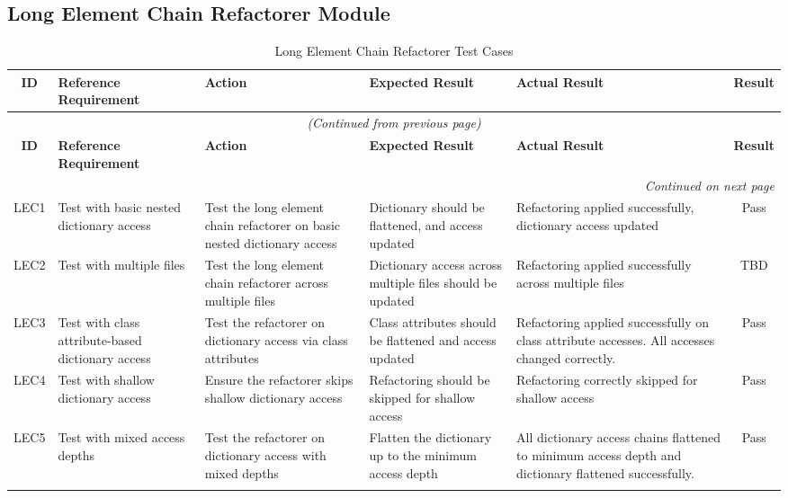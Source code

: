 \documentclass[12pt, titlepage]{article}
\begin{document}
\subsection{Long Element Chain Refactorer Module}

\begin{longtable}{|c|p{2.5cm}|p{3cm}|p{4cm}|p{2.5cm}|c|}
\hline
\textbf{ID} & \textbf{Reference Requirement} & \textbf{Action} & \textbf{Expected Result} & \textbf{Actual Result} & \textbf{Result} \\ \hline
\endfirsthead

\multicolumn{6}{c}{\textit{(Continued from previous page)}} \\ \hline
\textbf{ID} & \textbf{Reference Requirement} & \textbf{Action} & \textbf{Expected Result} & \textbf{Actual Result} & \textbf{Result} \\ \hline
\endhead

\hline \multicolumn{6}{|r|}{\textit{Continued on next page}} \\ \hline
\endfoot

\hline
\endlastfoot

LEC1 & Test with basic nested dictionary access & Test the long element chain refactorer on basic nested dictionary access & Dictionary should be flattened, and access updated & Refactoring applied successfully, dictionary access updated & \cellcolor{green!20} Pass \\ \hline
LEC2 & Test with multiple files & Test the long element chain refactorer across multiple files & Dictionary access across multiple files should be updated & Refactoring applied successfully across multiple files & \cellcolor{yellow!20} TBD \\ \hline
LEC3 & Test with class attribute-based dictionary access & Test the refactorer on dictionary access via class attributes & Class attributes should be flattened and access updated & Refactoring applied successfully on class attribute accesses. All accesses changed correctly. & \cellcolor{green!20} Pass \\ \hline
LEC4 & Test with shallow dictionary access & Ensure the refactorer skips shallow dictionary access & Refactoring should be skipped for shallow access & Refactoring correctly skipped for shallow access & \cellcolor{green!20} Pass \\ \hline
LEC5 & Test with mixed access depths & Test the refactorer on dictionary access with mixed depths & Flatten the dictionary up to the minimum access depth & All dictionary access chains flattened to minimum access depth and dictionary flattened successfully. & \cellcolor{green!20} Pass \\ \hline

\caption{Long Element Chain Refactorer Test Cases}
\label{table:lec_refactorer_tests}
\end{longtable}
\end{document}
